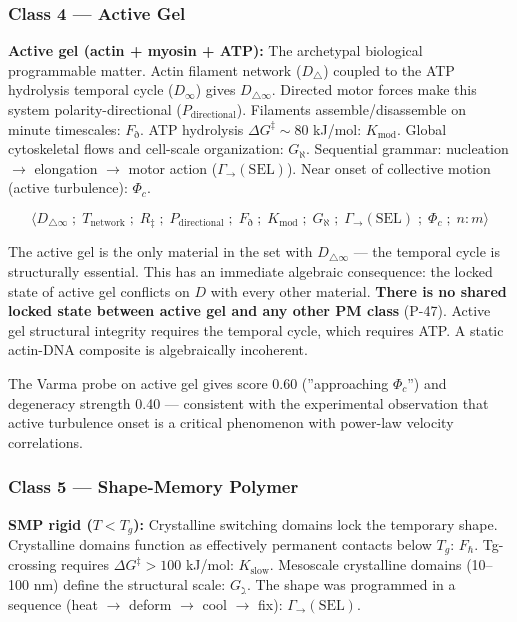 \documentclass[12pt,a4paper]{article}
\begin{document}
\subsubsection{Class 4 --- Active Gel}

\textbf{Active gel (actin + myosin + ATP):} The archetypal biological programmable matter. Actin filament network ($D_\triangle$) coupled to the ATP hydrolysis temporal cycle ($D_\infty$) gives $D_{\triangle\infty}$. Directed motor forces make this system polarity-directional ($P_\text{directional}$). Filaments assemble/disassemble on minute timescales: $F_\eth$. ATP hydrolysis $\Delta G^\ddagger \sim 80$ kJ/mol: $K_\text{mod}$. Global cytoskeletal flows and cell-scale organization: $G_\aleph$. Sequential grammar: nucleation $\to$ elongation $\to$ motor action ($\Gamma_\to(\text{SEL})$). Near onset of collective motion (active turbulence): $\Phi_c$.

\[\langle D_{\triangle\infty} \;;\; T_\text{network} \;;\; R_\ddagger \;;\; P_\text{directional} \;;\; F_\eth \;;\; K_\text{mod} \;;\; G_\aleph \;;\; \Gamma_\to(\text{SEL}) \;;\; \Phi_c \;;\; n:m \rangle\]

The active gel is the only material in the set with $D_{\triangle\infty}$ --- the temporal cycle is structurally essential. This has an immediate algebraic consequence: the locked state of active gel conflicts on $D$ with every other material. \textbf{There is no shared locked state between active gel and any other PM class} (P-47). Active gel structural integrity requires the temporal cycle, which requires ATP. A static actin-DNA composite is algebraically incoherent.

The Varma probe on active gel gives score 0.60 (''approaching $\Phi_c$'') and degeneracy strength 0.40 --- consistent with the experimental observation that active turbulence onset is a critical phenomenon with power-law velocity correlations.

\subsubsection{Class 5 --- Shape-Memory Polymer}

\textbf{SMP rigid ($T < T_g$):} Crystalline switching domains lock the temporary shape. Crystalline domains function as effectively permanent contacts below $T_g$: $F_\hbar$. Tg-crossing requires $\Delta G^\ddagger > 100$ kJ/mol: $K_\text{slow}$. Mesoscale crystalline domains (10--100 nm) define the structural scale: $G_\gimel$. The shape was programmed in a sequence (heat $\rightarrow$ deform $\rightarrow$ cool $\rightarrow$ fix): $\Gamma_\to(\text{SEL})$.
\end{document}
